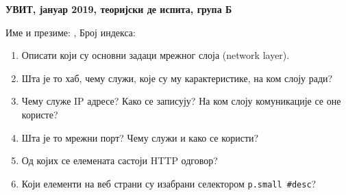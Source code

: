 \documentclass[a4paper]{article}
\begin{document}
\begin{center}
\textbf{УВИТ, јануар 2019, теоријски де испита, група Б}  
\end{center}

Име и презиме: \hrulefill, Број индекса: \hrulefill

\begin{enumerate}

\item Описати који су основни задаци мрежног слоја (network layer). \hrulefill

\hrulefill

\hrulefill

\hrulefill

\hrulefill

\item Шта је то хаб, чему служи, које су му карактеристике, на ком слоју ради? \hrulefill

\hrulefill

\hrulefill

\hrulefill

\hrulefill


\item Чему служе IP адресе? Како се записују? На ком слоју комуникације се оне користе?\hrulefill

\hrulefill

\hrulefill

\hrulefill

\hrulefill


\item Шта је то мрежни порт? Чему служи и како се користи? \hrulefill

\hrulefill

\hrulefill

\hrulefill

\hrulefill

\item Од којих се елемената састоји HTTP одговор?\hrulefill

\hrulefill

\hrulefill

\hrulefill

\hrulefill

\hrulefill

\hrulefill

\item Који елементи на веб страни су изабрани селектором \verb|p.small #desc|? \hrulefill

\hrulefill

\hrulefill



\end{enumerate}
\end{document}

